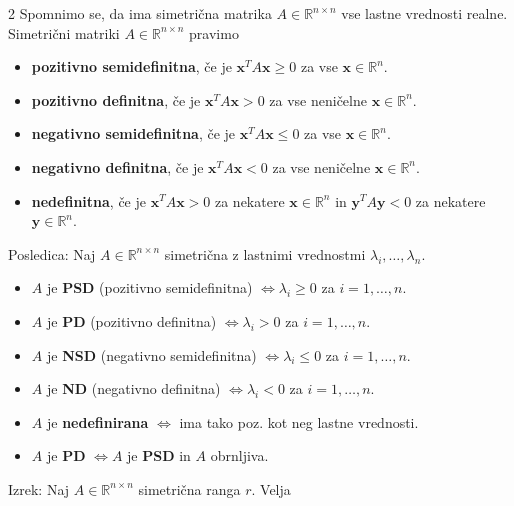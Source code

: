 \documentclass{article}
\begin{document}
\begin{multicols}{2}
	Spomnimo se, da ima simetrična matrika \( A \in \mathbb{R}^{n \times n} \) vse lastne vrednosti realne.
	Simetrični matriki \( A \in \mathbb{R}^{n \times n} \) pravimo
	\begin{small}
		\begin{itemize}
			\item \textbf{pozitivno semidefinitna}, če je \( \mathbf{x}^T A \mathbf{x} \geq 0 \) za vse \( \mathbf{x} \in \mathbb{R}^n \).
			\item \textbf{pozitivno definitna}, če je \( \mathbf{x}^T A \mathbf{x} > 0 \) za vse neničelne \( \mathbf{x} \in \mathbb{R}^n \).
			\item \textbf{negativno semidefinitna}, če je \( \mathbf{x}^T A \mathbf{x} \leq 0 \) za vse \( \mathbf{x} \in \mathbb{R}^n \).
			\item \textbf{negativno definitna}, če je \( \mathbf{x}^T A \mathbf{x} < 0 \) za vse neničelne \( \mathbf{x} \in \mathbb{R}^n \).
			\item \textbf{nedefinitna}, če je \( \mathbf{x}^T A \mathbf{x} > 0 \) za nekatere \( \mathbf{x} \in \mathbb{R}^n \) in \( \mathbf{y}^T A \mathbf{y} < 0 \) za nekatere \( \mathbf{y} \in \mathbb{R}^n \).
		\end{itemize}
	\end{small}
	Posledica: Naj \( A \in \mathbb{R}^{n \times n} \) simetrična z lastnimi vrednostmi \( \lambda_i, \ldots, \lambda_n \).
	\begin{small}
		\begin{itemize}
			\item \( A \) je \textbf{PSD} (pozitivno semidefinitna) \( \Leftrightarrow \lambda_i \geq 0 \) za \( i=1,\ldots,n \).
			\item \( A \) je \textbf{PD} (pozitivno definitna) \( \Leftrightarrow \lambda_i > 0 \) za \( i=1,\ldots,n \).
			\item \( A \) je \textbf{NSD} (negativno semidefinitna) \( \Leftrightarrow \lambda_i \leq 0 \) za \( i=1,\ldots,n \).
			\item \( A \) je \textbf{ND} (negativno definitna) \( \Leftrightarrow \lambda_i < 0 \) za \( i=1,\ldots,n \).
			\item \( A \) je \textbf{nedefinirana} \( \Leftrightarrow \) ima tako poz. kot neg lastne vrednosti.
			\item \( A \) je \textbf{PD} \( \Leftrightarrow A \) je \textbf{PSD} in \( A \) obrnljiva.
		\end{itemize}
	\end{small}
	Izrek: Naj \( A \in \mathbb{R}^{n \times n} \) simetrična ranga \( r \). Velja

\end{multicols}
\end{document}
